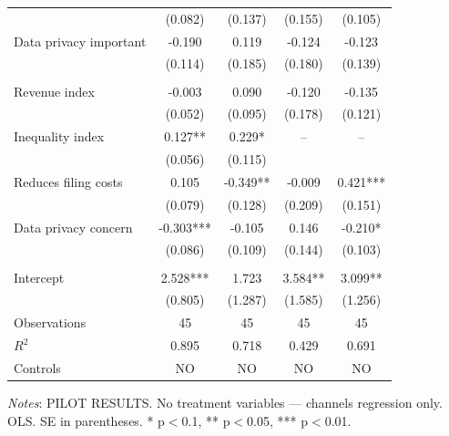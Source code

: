 \documentclass[11pt]{article}
\begin{document}
\begin{table}[!htbp]
\begin{threeparttable}
\begin{tabular}{l|cccc}
 & (0.082) & (0.137) & (0.155) & (0.105) \\
Data privacy important & -0.190 & 0.119 & -0.124 & -0.123 \\
 & (0.114) & (0.185) & (0.180) & (0.139) \\
\\[0.5em]
Revenue index & -0.003 & 0.090 & -0.120 & -0.135 \\
 & (0.052) & (0.095) & (0.178) & (0.121) \\
Inequality index & 0.127** & 0.229* & -- & -- \\
 & (0.056) & (0.115) &  &  \\
Reduces filing costs & 0.105 & -0.349** & -0.009 & 0.421*** \\
 & (0.079) & (0.128) & (0.209) & (0.151) \\
Data privacy concern & -0.303*** & -0.105 & 0.146 & -0.210* \\
 & (0.086) & (0.109) & (0.144) & (0.103) \\
\\[0.5em]
Intercept & 2.528*** & 1.723 & 3.584** & 3.099** \\
 & (0.805) & (1.287) & (1.585) & (1.256) \\
\midrule
Observations & 45 & 45 & 45 & 45 \\
$R^2$ & 0.895 & 0.718 & 0.429 & 0.691 \\
Controls & NO & NO & NO & NO \\
\bottomrule
\end{tabular}
\begin{tablenotes}[flushleft]
\footnotesize
\item \textit{Notes}: PILOT RESULTS. No treatment variables --- channels regression only. OLS. SE in parentheses. * p$<$0.1, ** p$<$0.05, *** p$<$0.01.
\end{tablenotes}
\end{threeparttable}
\end{table}
\end{document}
